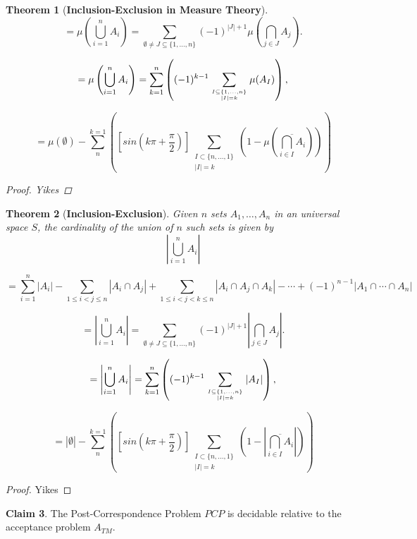 \documentclass[12pt a]{article}
\newtheorem{theorem}{Theorem}
\theoremstyle{definition}
\theoremstyle{definition}
\newtheorem{claim}[theorem]{Claim}
\theoremstyle{definition}
\begin{document}
{\begin{theorem}[\textbf{Inclusion-Exclusion in Measure Theory}]
$$
= {\displaystyle \mu \left(\bigcup _{i=1}^{n}A_{i}\right)=\sum _{\emptyset \neq J\subseteq \{1,\ldots ,n\}}(-1)^{|J|+1} \mu \left(\bigcap _{j\in J}A_{j}\right).}
$$

$$
= {\displaystyle \mu \left(\bigcup _{i=1}^{n}A_{i}\right)=\sum _{k=1}^{n}\left((-1)^{k-1}\sum _{I\subseteq \{1,\ldots ,n\} \atop |I|=k} \mu(A_{I})\right),}
$$

$$
= \mu(\emptyset) -\sum_{n}^{k=1} 
	\left( \left[ sin\left( k\pi + \frac{\pi}{2} \right) \right]  \sum_{ 
		\substack{I\subset \{ n,...,1 \} \\ |I|=k } } \left(1- \mu \left(  \overline{ \bigcap_{i \in I} A_i} \right)  \right)  \right)
$$

\begin{proof}
Yikes
\end{proof}

\end{theorem}


\begin{theorem}[\textbf{Inclusion-Exclusion}] 
Given $n$ sets $A_{1},\dots,A_{n}$ in an universal space $S$, the cardinality of the union of $n$ such sets is given by 
$$
\left|\bigcup _{i=1}^{n}A_{i}\right|
$$

$$
= \sum _{i=1}^{n}|A_{i}|-\sum _{1\leqslant i<j\leqslant n}|A_{i}\cap A_{j}|+\sum _{1\leqslant i<j<k\leqslant n}|A_{i}\cap A_{j}\cap A_{k}|-\cdots +(-1)^{n-1}\left|A_{1}\cap \cdots \cap A_{n}\right|
$$

$$
= {\displaystyle \left|\bigcup _{i=1}^{n}A_{i}\right|=\sum _{\emptyset \neq J\subseteq \{1,\ldots ,n\}}(-1)^{|J|+1}\left|\bigcap _{j\in J}A_{j}\right|.}
$$

$$
= {\displaystyle  \left|\bigcup _{i=1}^{n}A_{i}\right|=\sum _{k=1}^{n}\left((-1)^{k-1}\sum _{I\subseteq \{1,\ldots ,n\} \atop |I|=k} |A_{I}|\right),}
$$

$$
= |\emptyset| -\sum_{n}^{k=1} 
	\left( \left[ sin\left( k\pi + \frac{\pi}{2} \right) \right]  \sum_{ 
		\substack{I\subset \{ n,...,1 \} \\ |I|=k } } \left(1- \left|  \overline{ \bigcap_{i \in I} A_i} \right|  \right)  \right) 
$$


\end{theorem}

\begin{proof}
Yikes
\end{proof}




\newpage

\begin{claim} 
The Post-Correspondence Problem $PCP$ is decidable relative to the acceptance problem $A_{TM}$. 
\end{claim}

}
\end{document}
